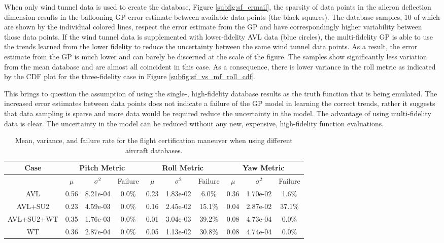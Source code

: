 When only wind tunnel data is used to create the database, Figure \ref{subfig:sf_crmail}, the sparsity of data points in the aileron deflection dimension results in the ballooning GP error estimate between available data points (the black squares).
The database samples, $10$ of which are shown by the individual colored lines,  respect the error estimate from the GP and have correspondingly higher variability between those data points.
If the wind tunnel data is supplemented with lower-fidelity AVL data (blue circles), the multi-fidelity GP is able to use the trends learned from the lower fidelity to reduce the uncertainty between the same wind tunnel data points. 
As a result, the error estimate from the GP is much lower and can barely be discerned at the scale of the figure. 
The samples show significantly less variation from the mean database and are almost all coincident in this case. 
As a consequence, there is lower variance in the roll metric as indicated by the CDF plot for the three-fidelity case in Figure \ref{subfig:sf_vs_mf_roll_cdf}.

This brings to question the assumption of using the single-, high-fidelity database results as the truth function that is being emulated. 
The increased error estimates between data points does not indicate a failure of the GP model in learning the correct trends, rather it suggests that data sampling is sparse and more data would be required reduce the uncertainty in the model.
The advantage of using multi-fidelity data is clear. 
The uncertainty in the model can be reduced without any new, expensive, high-fidelity function evaluations.

\begin{table}
\centering
    \renewcommand{\arraystretch}{1.2}
    \captionsetup{justification=centering}
    \caption{Mean, variance, and failure rate for the flight certification maneuver when using different aircraft databases.} 
    \begin{tabular}{|c|c|c|c|c|c|c|c|c|c|}
    \hline
        Case & \multicolumn{3}{c|}{Pitch Metric} & \multicolumn{3}{c|}{Roll Metric} & \multicolumn{3}{c|}{Yaw Metric} \\ \hline
         & $\mu$ & $\sigma^2$ & Failure & $\mu$ & $\sigma^2$ & Failure & $\mu$ & $\sigma^2$ & Failure \\ \hline
        AVL & 0.56 & 8.21e-04 & 0.0\% & 0.23 & 1.83e-02 & 6.0\% & 0.36 & 1.70e-02 & 1.6\% \\ \hline
        AVL+SU2 & 0.23 & 4.59e-03 & 0.0\% & 0.16 & 2.45e-02 & 15.1\% & 0.04 & 2.87e-02 & 37.1\% \\ \hline
        AVL+SU2+WT & 0.35 & 1.76e-03 & 0.0\% & 0.01 & 3.04e-03 & 39.2\% & 0.08 & 4.73e-04 & 0.0\% \\ \hline
        WT & 0.36 & 2.87e-04 & 0.0\% & 0.05 & 1.13e-02 & 30.8\% & 0.08 & 4.74e-04 & 0.0\% \\ \hline
    \end{tabular}
    \label{tab:sf_vs_mf_perf_stats}
\end{table}

